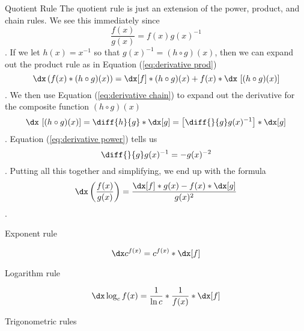 \begin{psec}{Quotient Rule} The quotient rule is just an extension of the
    power, product, and chain rules. We see this immediately since 
    \begin{equation*}
        \frac{f(x)}{g(x)} = f(x)g(x)^{-1}
    \end{equation*}
    . If we let $h(x) = x^{-1}$ so that $g(x)^{-1} = (h\circ g)(x)$, then we can expand out the product rule as
    in Equation (\ref{eq:derivative prod})
    \begin{equation*}
        \dx \left(f(x) * (h\circ g)(x)\right) = \dx[f] *  (h\circ g)(x) + f(x) *
        \dx\ [(h\circ g)(x)]
    \end{equation*}. We then use Equation (\ref{eq:derivative chain}) to expand out the
    derivative for the composite function $(h \circ g)(x)$
    \begin{equation*}
        \dx\ [(h\circ g)(x)] = \diff{h}{g} * \dx[g] = \left[\diff{}{g} g(x)^{-1}
        \right] * \dx[g]
    \end{equation*}. Equation (\ref{eq:derivative power}) tells us 
    \begin{equation*}
        \diff{}{g} g(x)^{-1} = -g(x)^{-2}
    \end{equation*}. Putting all this together and simplifying, we end up with
    the formula
    \begin{equation}
        \dx \left(\frac{f(x)}{g(x)}\right) = \frac{\dx[f] * g(x) - f(x) * \dx[g]
        }{g(x)^2}
    \end{equation}.

\end{psec}

\begin{psec}{Exponent rule}

    \begin{equation}
        \dx c ^ {f(x)} = c ^ {f(x)} * \dx[f]
    \end{equation}

\end{psec}

\begin{psec}{Logarithm rule}

    \begin{equation}
        \dx \log_c f(x) = \frac{1}{\ln c} * \frac{1}{f(x)} * \dx[f]
    \end{equation}

\end{psec}


\begin{psec}{Trigonometric rules}


\end{psec}
